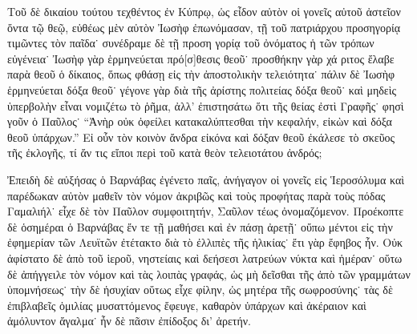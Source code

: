 Τοῦ δὲ δικαίου τούτου τεχθέντος ἐν Κύπρῳ, ὡς εἶδον
αὐτὸν οἱ γονεῖς αὐτοῦ ἀστεῖον ὄντα τῷ θεῷ, εὐθέως
μὲν αὐτὸν Ἰωσὴφ ἐπωνόμασαν, τῇ τοῦ πατριάρχου
προσηγορίᾳ τιμῶντες τὸν παῖδα˙ συνέδραμε δὲ τῇ προση%
γορίᾳ τοῦ ὀνόματος ἡ τῶν τρόπων εὐγένεια˙ Ἰωσὴφ
γὰρ ἑρμηνεύεται πρό[σ]θεσις θεοῦ˙ προσθήκην γὰρ χά%
ριτος ἔλαβε παρὰ θεοῦ ὁ δίκαιος, ὅπως φθάσῃ εἰς τὴν
ἀποστολικὴν τελειότητα˙ πάλιν δὲ Ἰωσὴφ ἑρμηνεύεται
δόξα θεοῦ˙ γέγονε γὰρ διὰ τῆς ἀρίστης πολιτείας δόξα
θεοῦ˙ καὶ μηδεὶς ὑπερβολὴν εἶναι νομιζέτω τὸ ῥῆμα,
ἀλλ’ ἐπιστησάτω ὅτι τῆς θείας ἐστὶ Γραφῆς˙ φησὶ γοῦν
ὁ Παῦλος˙ \enquote{Ἀνὴρ οὐκ ὀφείλει κατακαλύπτεσθαι τὴν
κεφαλήν, εἰκὼν καὶ δόξα θεοῦ ὑπάρχων.} Εἰ οὖν τὸν
κοινὸν ἄνδρα εἰκόνα καὶ δόξαν θεοῦ ἐκάλεσε τὸ σκεῦος
τῆς ἐκλογῆς, τί ἄν τις εἴποι περὶ τοῦ κατὰ θεὸν
τελειοτάτου ἀνδρός;

Ἐπειδὴ δὲ αὐξήσας ὁ Βαρνάβας ἐγένετο παῖς, ἀνήγαγον
οἱ γονεῖς εἰς Ἱεροσόλυμα καὶ παρέδωκαν αὐτὸν μαθεῖν
τὸν νόμον ἀκριβῶς καὶ τοὺς προφήτας παρὰ τοὺς πόδας
Γαμαλιήλ˙ εἶχε δὲ τὸν Παῦλον συμφοιτητήν, Σαῦλον τέως
ὀνομαζόμενον. Προέκοπτε δὲ ὁσημέραι ὁ Βαρνάβας ἔν
τε τῇ μαθήσει καὶ ἐν πάσῃ ἀρετῇ˙ οὔπω μέντοι εἰς
τὴν ἐφημερίαν τῶν Λευϊτῶν ἐτέτακτο διὰ τὸ ἐλλιπὲς τῆς
ἡλικίας˙ ἔτι γὰρ ἔφηβος ἦν. Οὐκ ἀφίστατο δὲ ἀπὸ τοῦ
ἱεροῦ, νηστείαις καὶ δεήσεσι λατρεύων νύκτα καὶ ἡμέραν˙
οὕτω δὲ ἀπήγγειλε τὸν νόμον καὶ τὰς λοιπὰς γραφάς,
ὡς μὴ δεῖσθαι τῆς ἀπὸ τῶν γραμμάτων ὑπομνήσεως˙
τὴν δὲ ἡσυχίαν οὕτως εἶχε φίλην, ὡς μητέρα τῆς
σωφροσύνης˙ τὰς δὲ ἐπιβλαβεῖς ὁμιλίας μυσαττόμενος
ἔφευγε, καθαρὸν ὑπάρχων καὶ ἀκέραιον καὶ ἀμόλυντον
ἄγαλμα˙ ἦν δὲ πᾶσιν ἐπίδοξος δι’ ἀρετήν.

